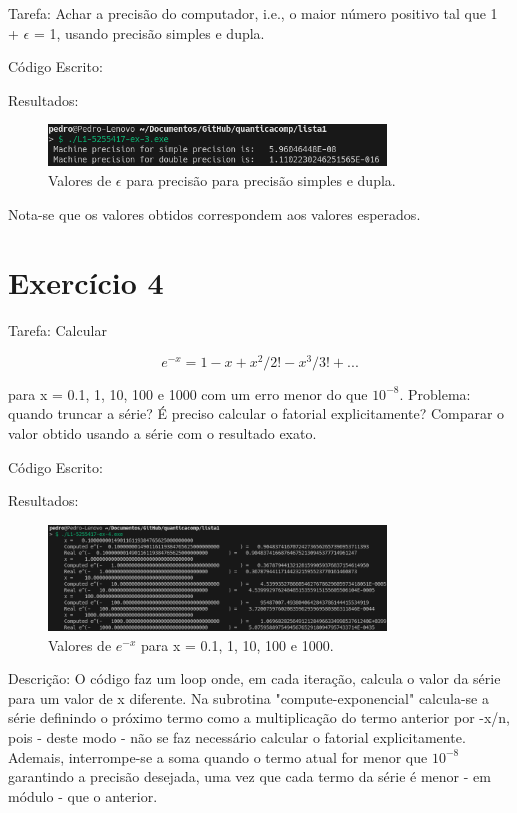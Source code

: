 \documentclass[12pt, a4paper]{article} %
\begin{document}
Tarefa: Achar a precis\~ao  do computador, i.e., o maior n\'umero positivo  tal que
1 + $\epsilon$ = 1, usando precis\~ao simples e dupla.

C\'odigo Escrito:


Resultados:
\begin{figure}[H]
    \centering
    \includegraphics[width=0.8\textwidth]{../images/results-ex3.png}
    \caption{Valores de $\epsilon$ para precis\~ao para precis\~ao simples e dupla.}
\end{figure}

Nota-se que os valores obtidos correspondem aos valores esperados.

\section{Exerc\'icio 4}

Tarefa: Calcular

\begin{equation} e^{-x} = 1 - x + x^2/2! - x^3/3! + ... \end{equation}

para x = 0.1, 1, 10, 100 e 1000 com um erro menor do que $10^{-8}$. Problema: quando truncar a s\'erie? \'E preciso calcular o fatorial explicitamente? Comparar o valor obtido usando a s\'erie com o resultado exato.

C\'odigo Escrito:


Resultados:
\begin{figure}[H]
    \centering
    \includegraphics[width=0.8\textwidth]{../images/results-ex4.png}
    \caption{Valores de $e^{-x}$ para x = 0.1, 1, 10, 100 e 1000.}
\end{figure}

Descri\c{c}\~ao: O c\'odigo faz um loop onde, em cada itera\c{c}\~ao, calcula o valor da s\'erie para um valor de x diferente. Na subrotina "compute-exponencial" calcula-se a s\'erie definindo o pr\'oximo termo como a multiplica\c{c}\~ao do termo anterior por -x/n, pois - deste modo - n\~ao se faz necess\'ario calcular o fatorial explicitamente. Ademais, interrompe-se a soma quando o termo atual for menor que $10^{-8}$ garantindo a precis\~ao desejada, uma vez que cada termo da s\'erie \'e menor - em m\'odulo - que o anterior.
\end{document}
